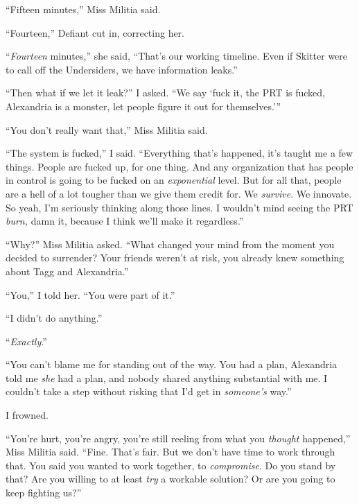 ``Fifteen minutes,'' Miss Militia said.



``Fourteen,'' Defiant cut in, correcting her.



``\emph{Fourteen} minutes,'' she said, ``That's our working timeline.  Even if Skitter were to call off the Undersiders, we have information leaks.''



``Then what if we let it leak?'' I asked.  ``We say `fuck it, the PRT is fucked, Alexandria is a monster, let people figure it out for themselves.'''



``You don't really want that,'' Miss Militia said.



``The system is fucked,'' I said.  ``Everything that's happened, it's taught me a few things.  People are fucked up, for one thing.  And any organization that has people in control is going to be fucked on an \emph{exponential} level.  But for all that, people are a hell of a lot tougher than we give them credit for.  We \emph{survive}.  We innovate.  So yeah, I'm seriously thinking along those lines.  I wouldn't mind seeing the PRT \emph{burn, }damn it, because I think we'll make it regardless.''



``Why?''  Miss Militia asked.  ``What changed your mind from the moment you decided to surrender?  Your friends weren't at risk, you already knew something about Tagg and Alexandria.''



``You,'' I told her.  ``You were part of it.''



``I didn't do anything.''



``\emph{Exactly}.''



``You can't blame me for standing out of the way.  You had a plan, Alexandria told me \emph{she} had a plan, and nobody shared anything substantial with me.  I couldn't take a step without risking that I'd get in \emph{someone's} way.''



I frowned.



``You're hurt, you're angry, you're still reeling from what you \emph{thought} happened,'' Miss Militia said.  ``Fine.  That's fair.  But we don't have time to work through that.  You said you wanted to work together, to \emph{compromise}.\emph{  }Do you stand by that?  Are you willing to at least \emph{try} a workable solution?  Or are you going to keep fighting us?''



